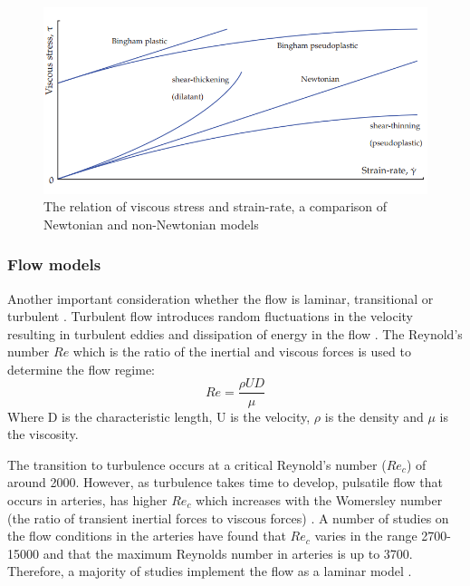 \begin{figure}[ht!]
\centering
\includegraphics[width=\textwidth]{Figures/viscosity}
\caption{The relation of viscous stress and strain-rate, a comparison of Newtonian and non-Newtonian models \cite{Gabriel2017THEGROWTH}}
\label{fig:visc}
\end{figure}

\subsubsection{Flow models}
Another important consideration whether the flow is laminar, transitional or turbulent \cite{Morris2016ComputationalMedicine}. Turbulent flow introduces random fluctuations in the velocity resulting in turbulent eddies and dissipation of energy in the flow \cite{DongenF.N.vandeVosse2003CardiovascularMechanics}. The Reynold's number $Re$ which is the ratio of the inertial and viscous forces is used to determine the flow regime: 
\begin{equation}
Re = \frac{\rho UD}{\mu}
\end{equation}
Where D is the characteristic length, U is the velocity, $\rho$ is the density and $\mu$ is the viscosity.\par

The transition to turbulence occurs at a critical Reynold's number ($Re_c$) of around 2000. However, as turbulence takes time to develop, pulsatile flow that occurs in arteries, has higher $Re_c$ which increases with the Womersley number (the ratio of transient inertial forces to viscous forces) \cite{Alimohammadi2015PredictingApproach}. A number of studies on the flow conditions in the arteries have found that $Re_c$ varies in the range 2700-15000 and that the maximum Reynolds number in arteries is up to 3700. Therefore, a majority of studies implement the flow as a laminar model \cite{Ku1997BLOODARTERIES}. \par


